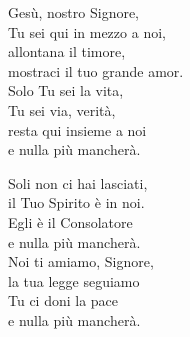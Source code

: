 
\strofa Gesù, nostro Signore,\\
Tu sei qui in mezzo a noi,\\
allontana il timore,\\
mostraci il tuo grande amor.\\
Solo Tu sei la vita,\\
Tu sei via, verità,\\
resta qui insieme a noi\\
e nulla più mancherà.

\spazio


\spazio

\strofa Soli non ci hai lasciati,\\
il Tuo Spirito è in noi.\\
Egli è il Consolatore\\
e nulla più mancherà.\\
Noi ti amiamo, Signore,\\
la tua legge seguiamo\\
Tu ci doni la pace\\
e nulla più mancherà.

\spazio

